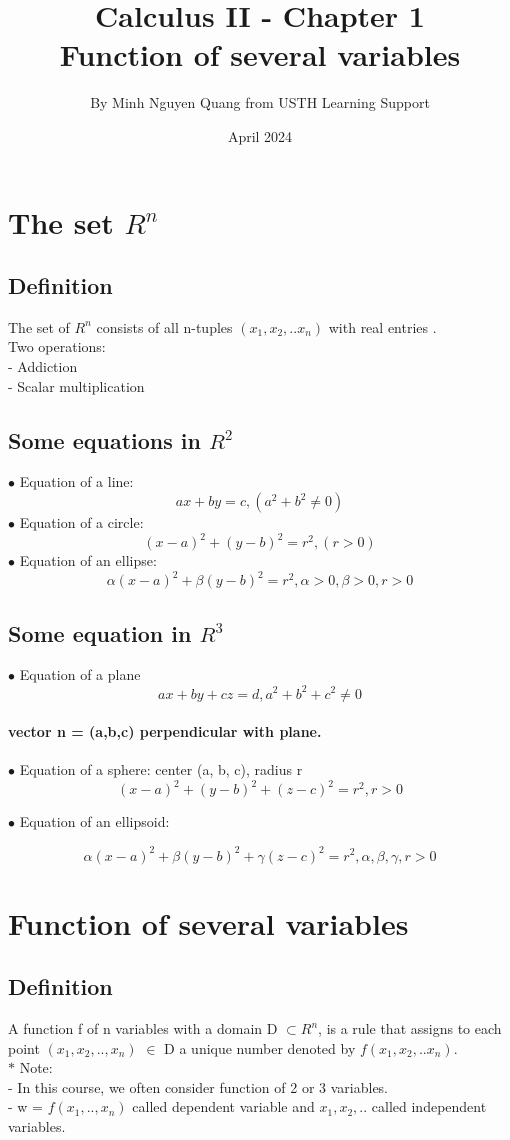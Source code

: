 \documentclass[12pt]{article}
\title{Calculus II - Chapter 1 \\  Function of several variables }
\author{By Minh Nguyen Quang from USTH Learning Support}
\date{April 2024}
\begin{document}
\maketitle
\tableofcontents
\newpage
\section{The set $R^n$}
\subsection{Definition}
The set of $R^n$ consists of all n-tuples $(x_1,x_2,..x_n)$ with real entries .\\
Two operations:\\
- Addiction\\
- Scalar multiplication
\subsection{Some equations in $R^2$}

$\bullet$ Equation of a line:
$$  ax+by= c, (a^2+b^2 \neq 0) $$
$\bullet$ Equation of a circle:
$$(x-a)^2 +(y-b)^2 = r^2, (r>0)$$
$\bullet$ Equation of an ellipse:
$$\alpha(x-a)^2 + \beta(y-b)^2 = r^2 , \alpha > 0,\beta>0, r>0 $$
\subsection{Some equation in $R^3$}

$\bullet$ Equation of a plane
$$ ax + by +cz = d, a^2 +b^2 +c^2 \neq 0$$
 \paragraph{ vector n = (a,b,c) perpendicular with plane.\\}
$\bullet$ Equation of a sphere: center (a, b, c), radius r
$$(x-a)^2 +(y-b)^2 + (z-c)^2 =r^2, r >0 $$

$\bullet$ Equation of an ellipsoid:

$$\alpha(x-a)^2 +\beta(y-b)^2 + \gamma(z-c)^2 =r^2, \alpha,\beta,\gamma, r >0 $$

\section{Function of several variables}
\subsection{Definition}
 A function f of n variables with a domain D $\subset R^n$, is a rule that assigns to each point $(x_1,x_2,..,x_n)$ $\in$ D a unique number denoted by $f(x_1,x_2,..x_n)$. \\
 $\ast$ Note: \\
 - In this course, we often consider function of 2 or 3 variables. \\
 - w = $f(x_1,..,x_n)$ called dependent variable and $x_1,x_2,..$ called independent variables.\\
\end{document}
